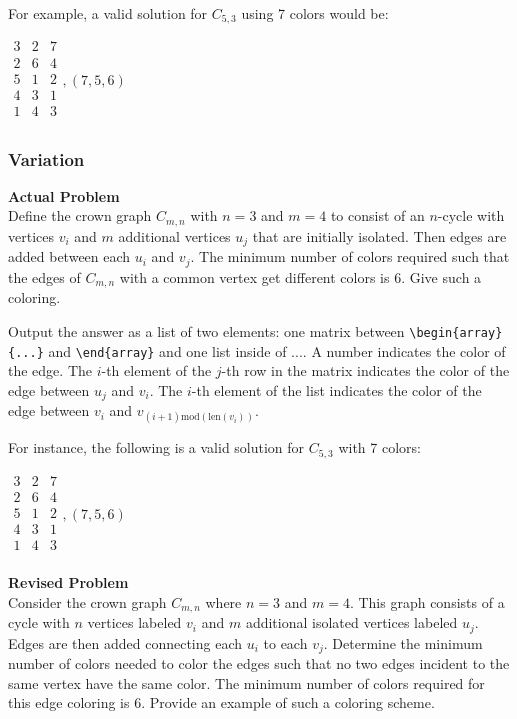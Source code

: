 For example, a valid solution for $C_{5, 3}$ using 7 colors would be:

$\boxed{
\begin{array}{ccc}
3 & 2 & 7 \\
2 & 6 & 4 \\
5 & 1 & 2 \\
4 & 3 & 1 \\
1 & 4 & 3 \\
\end{array},
(7, 5, 6)
}$

\subsubsection{Variation}
\textbf{Actual Problem}\\
Define the crown graph $C_{m, n}$ with $n = 3$ and $m = 4$ to consist of an $n$-cycle with vertices $v_i$ and $m$ additional vertices $u_j$ that are initially isolated. Then edges are added between each $u_i$ and $v_j$. The minimum number of colors required such that the edges of $C_{m, n}$ with a common vertex get different colors is 6. Give such a coloring.

Output the answer as a list of two elements: one matrix between \verb|\begin{array}{...}| and \verb|\end{array}| and one list inside of $\boxed{...}$. A number indicates the color of the edge. The $i$-th element of the $j$-th row in the matrix indicates the color of the edge between $u_j$ and $v_i$. The $i$-th element of the list indicates the color of the edge between $v_i$ and $v_{(i+1) \text{mod}(\text{len}(v_i))}$.

For instance, the following is a valid solution for $C_{{5, 3}}$ with 7 colors:

$\boxed{
\begin{array}{ccc}
3 & 2 & 7 \\
2 & 6 & 4 \\
5 & 1 & 2 \\
4 & 3 & 1 \\
1 & 4 & 3 \\
\end{array},
(7, 5, 6)
}$



\textbf{Revised Problem}\\
Consider the crown graph \( C_{m, n} \) where \( n = 3 \) and \( m = 4 \). This graph consists of a cycle with \( n \) vertices labeled \( v_i \) and \( m \) additional isolated vertices labeled \( u_j \). Edges are then added connecting each \( u_i \) to each \( v_j \). Determine the minimum number of colors needed to color the edges such that no two edges incident to the same vertex have the same color. The minimum number of colors required for this edge coloring is 6. Provide an example of such a coloring scheme.


